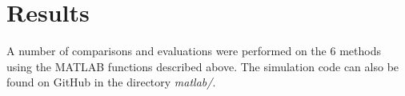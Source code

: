 \section{Results}

A number of comparisons and evaluations were performed  on  the  6 methods using
the MATLAB functions described above. The simulation code can  also  be found on
GitHub\cite{ref:TheComet93} in the directory \textit{matlab/}.




